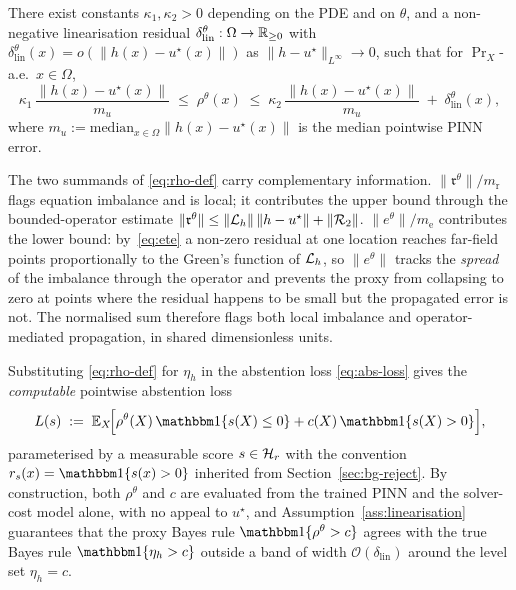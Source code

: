 \begin{assumption}
\label{ass:linearisation}
There exist constants $\kappa_1,\kappa_2>0$ depending on the PDE and on
$\theta$, and a non-negative linearisation residual
$\delta_{\mathrm{lin}}^\theta:\Omega\to\mathbb{R}_{\geq 0}$ with
$\delta_{\mathrm{lin}}^\theta(x)=o(\|h(x)-u^\star(x)\|)$ as
$\|h-u^\star\|_{L^\infty}\to 0$, such that for $\Pr_X$-a.e.\ $x\in\Omega$,
\[
  \kappa_1\,\frac{\bigl\|h(x)-u^\star(x)\bigr\|}{m_{u}}
  \;\leq\;\rho^\theta(x)\;\leq\;
  \kappa_2\,\frac{\bigl\|h(x)-u^\star(x)\bigr\|}{m_{u}}
  \;+\;\delta_{\mathrm{lin}}^\theta(x),
\]
where $m_{u}:=\mathrm{median}_{x\in\Omega}\|h(x)-u^\star(x)\|$ is the
median pointwise PINN error.
\end{assumption}

The two summands of \eqref{eq:rho-def} carry complementary information.
$\|\mathfrak{r}^\theta\|/m_{\mathrm{r}}$ flags equation imbalance and is
local; it contributes the upper bound through the bounded-operator
estimate
$\|\mathfrak{r}^\theta\|\leq\|\mathcal{L}_h\|\,\|h-u^\star\|+\|\mathcal{R}_2\|$.
$\|e^\theta\|/m_{\mathrm{e}}$ contributes the lower bound: by~\eqref{eq:ete}
a non-zero residual at one location reaches far-field points
proportionally to the Green's function of $\mathcal{L}_h$, so $\|e^\theta\|$
tracks the \emph{spread} of the imbalance through the operator and
prevents the proxy from collapsing to zero at points where the residual
happens to be small but the propagated error is not. The normalised sum
therefore flags both local imbalance and operator-mediated propagation,
in shared dimensionless units.

Substituting \eqref{eq:rho-def} for $\eta_h$ in the abstention loss
\eqref{eq:abs-loss} gives the \emph{computable} pointwise abstention loss
\begin{equation}
  L(s)
  \;:=\;
  \E_X\!\Bigl[\rho^\theta(X)\,\ind\{s(X)\leq 0\}+c(X)\,\ind\{s(X)>0\}\Bigr],
  \label{eq:proxy-target}
\end{equation}
parameterised by a measurable score $s\in\mathcal{H}_r$ with the convention
$r_s(x)=\ind\{s(x)>0\}$ inherited from Section~\ref{sec:bg-reject}. By
construction, both $\rho^\theta$ and $c$ are evaluated from the trained
PINN and the solver-cost model alone, with no appeal to $u^\star$, and
Assumption~\ref{ass:linearisation} guarantees that the proxy Bayes rule
$\ind\{\rho^\theta>c\}$ agrees with the true Bayes rule
$\ind\{\eta_h>c\}$ outside a band of width $\mathcal{O}(\delta_{\mathrm{lin}})$
around the level set $\eta_h=c$.


